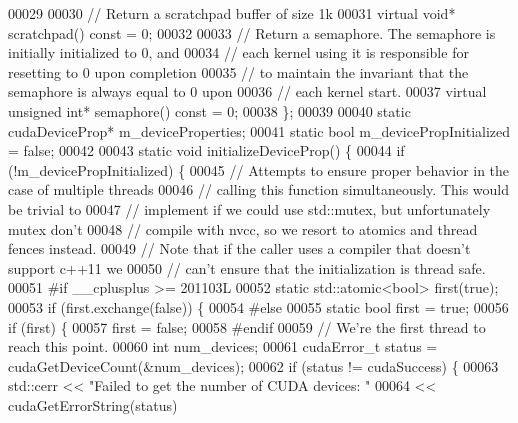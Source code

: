 \begin{DoxyCode}
00029 
00030   \textcolor{comment}{// Return a scratchpad buffer of size 1k}
00031   \textcolor{keyword}{virtual} \textcolor{keywordtype}{void}* scratchpad() \textcolor{keyword}{const} = 0;
00032 
00033   \textcolor{comment}{// Return a semaphore. The semaphore is initially initialized to 0, and}
00034   \textcolor{comment}{// each kernel using it is responsible for resetting to 0 upon completion}
00035   \textcolor{comment}{// to maintain the invariant that the semaphore is always equal to 0 upon}
00036   \textcolor{comment}{// each kernel start.}
00037   \textcolor{keyword}{virtual} \textcolor{keywordtype}{unsigned} \textcolor{keywordtype}{int}* semaphore() \textcolor{keyword}{const} = 0;
00038 \};
00039 
00040 \textcolor{keyword}{static} cudaDeviceProp* m\_deviceProperties;
00041 \textcolor{keyword}{static} \textcolor{keywordtype}{bool} m\_devicePropInitialized = \textcolor{keyword}{false};
00042 
00043 \textcolor{keyword}{static} \textcolor{keywordtype}{void} initializeDeviceProp() \{
00044   \textcolor{keywordflow}{if} (!m\_devicePropInitialized) \{
00045     \textcolor{comment}{// Attempts to ensure proper behavior in the case of multiple threads}
00046     \textcolor{comment}{// calling this function simultaneously. This would be trivial to}
00047     \textcolor{comment}{// implement if we could use std::mutex, but unfortunately mutex don't}
00048     \textcolor{comment}{// compile with nvcc, so we resort to atomics and thread fences instead.}
00049     \textcolor{comment}{// Note that if the caller uses a compiler that doesn't support c++11 we}
00050     \textcolor{comment}{// can't ensure that the initialization is thread safe.}
00051 \textcolor{preprocessor}{#if \_\_cplusplus >= 201103L}
00052     \textcolor{keyword}{static} std::atomic<bool> first(\textcolor{keyword}{true});
00053     \textcolor{keywordflow}{if} (first.exchange(\textcolor{keyword}{false})) \{
00054 \textcolor{preprocessor}{#else}
00055     \textcolor{keyword}{static} \textcolor{keywordtype}{bool} first = \textcolor{keyword}{true};
00056     \textcolor{keywordflow}{if} (first) \{
00057       first = \textcolor{keyword}{false};
00058 \textcolor{preprocessor}{#endif}
00059       \textcolor{comment}{// We're the first thread to reach this point.}
00060       \textcolor{keywordtype}{int} num\_devices;
00061       cudaError\_t status = cudaGetDeviceCount(&num\_devices);
00062       \textcolor{keywordflow}{if} (status != cudaSuccess) \{
00063         std::cerr << \textcolor{stringliteral}{"Failed to get the number of CUDA devices: "}
00064                   << cudaGetErrorString(status)

\end{DoxyCode}
